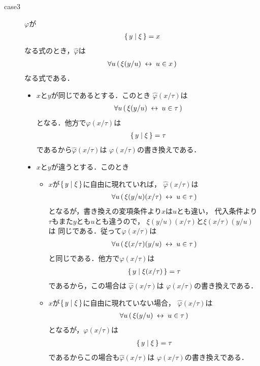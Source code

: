 \begin{metaprf}[第一]
\begin{description}
\begin{description}
					\item[case3] $\varphi$が
						\begin{align}
							\{\, y \mid \xi\, \} = x
						\end{align}
						なる式のとき，$\widehat{\varphi}$は
						\begin{align}
							\forall u\, (\, \xi(y/u) \hspace{0.25em}\leftrightarrow\hspace{0.25em} u \in x\, )
						\end{align}
						なる式である．
						\begin{itemize}
							\item $x$と$y$が同じであるとする．このとき
								$\widehat{\varphi}(x/\tau)$は
								\begin{align}
									\forall u\, (\, \xi(y/u) \hspace{0.25em}\leftrightarrow\hspace{0.25em} u \in \tau\, )
								\end{align}
								となる．他方で$\varphi(x/\tau)$は
								\begin{align}
									\{\, y \mid \xi\, \} = \tau
								\end{align}
								であるから$\widehat{\varphi}(x/\tau)$は
								$\varphi(x/\tau)$の書き換えである．
								
							\item $x$と$y$が違うとする．このとき
								\begin{itemize}
									\item $x$が$\{\, y \mid \xi\, \}$に自由に現れていれば，
										$\widehat{\varphi}(x/\tau)$は
										\begin{align}
											\forall u\, (\, \xi(y/u)(x/\tau) \hspace{0.25em}\leftrightarrow\hspace{0.25em} u \in \tau\, )
										\end{align}
										となるが，書き換えの変項条件より$x$は$u$とも違い，
										代入条件より$\tau$もまた$y$とも$u$とも違うので，
										$\xi(y/u)(x/\tau)$と$\xi(x/\tau)(y/u)$は
										同じである．従って$\widehat{\varphi}(x/\tau)$は
										\begin{align}
											\forall u\, (\, \xi(x/\tau)(y/u) \hspace{0.25em}\leftrightarrow\hspace{0.25em} u \in \tau\, )
										\end{align}
										と同じである．他方で$\varphi(x/\tau)$は
										\begin{align}
											\{\, y \mid \xi(x/\tau)\, \} = \tau
										\end{align}
										であるから，この場合は
										$\widehat{\varphi}(x/\tau)$は
										$\varphi(x/\tau)$の書き換えである．
								
									\item $x$が$\{\, y \mid \xi\, \}$に自由に現れていない場合，
										$\widehat{\varphi}(x/\tau)$は
										\begin{align}
											\forall u\, (\, \xi(y/u) \hspace{0.25em}\leftrightarrow\hspace{0.25em} u \in \tau\, )
										\end{align}
										となるが，$\varphi(x/\tau)$は
										\begin{align}
											\{\, y \mid \xi\, \} = \tau
										\end{align}
										であるからこの場合も$\widehat{\varphi}(x/\tau)$は
										$\varphi(x/\tau)$の書き換えである．
								\end{itemize}
						\end{itemize}
						

\end{description}
\end{description}
\end{metaprf}
